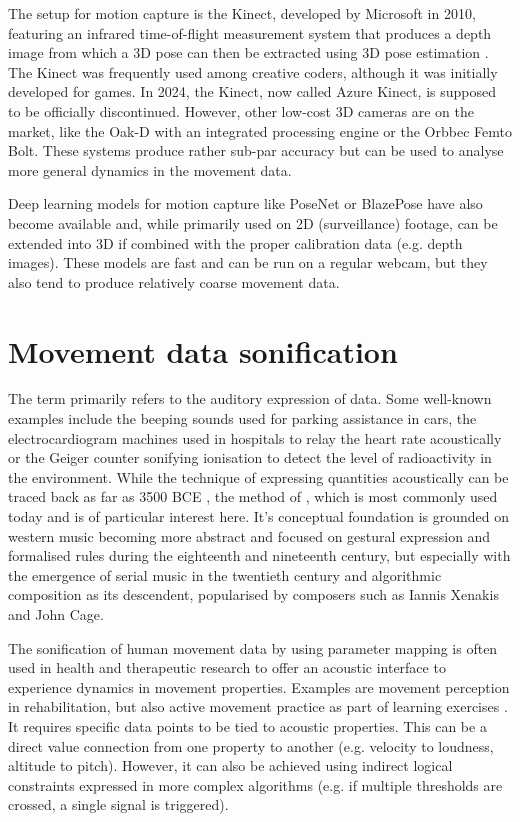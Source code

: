 The  setup for motion capture is the Kinect, developed by Microsoft in 2010, featuring an infrared time-of-flight measurement system that produces a depth image from which a 3D pose can then be extracted using \ac{3D} pose estimation \parencite[see][]{poseEstimationPaper}. The Kinect was frequently used among creative coders, although it was initially developed for games. In 2024, the Kinect, now called Azure Kinect, is supposed to be officially discontinued. However, other low-cost 3D cameras are on the market, like the Oak-D with an integrated processing engine or the Orbbec Femto Bolt. These systems produce rather sub-par accuracy but can be used to analyse more general dynamics in the movement data.

Deep learning models for motion capture like PoseNet or BlazePose have also become available and, while primarily used on 2D (surveillance) footage, can be extended into 3D if combined with the proper calibration data (e.g. depth images). These models are fast and can be run on a regular webcam, but they also tend to produce relatively coarse movement data.

\section{Movement data sonification}

The term  primarily refers to the auditory expression of data. Some well-known examples include the beeping sounds used for parking assistance in cars, the electrocardiogram machines used in hospitals to relay the heart rate acoustically or the Geiger counter sonifying ionisation to detect the level of radioactivity in the environment. While the technique of expressing quantities acoustically can be traced back as far as 3500 BCE \parencite[178]{sonificationPreHistory}, the method of  \parencite[Chapter~15]{sonificationHandbook}, which is most commonly used today and is of particular interest here. It's conceptual foundation is grounded on western music becoming more abstract and focused on gestural expression and formalised rules during the eighteenth and nineteenth century, but especially with the emergence of serial music in the twentieth century \parencite[179-180]{sonificationPreHistory} and algorithmic composition as its descendent, popularised by composers such as Iannis Xenakis and John Cage.

The sonification of human movement data by using parameter mapping is often used in health and therapeutic research to offer an acoustic interface to experience dynamics in movement properties. Examples are movement perception in rehabilitation, but also active movement practice as part of learning exercises \parencite[see][]{ifMotionSounds}. It requires specific data points to be tied to acoustic properties. This can be a direct value connection from one property to another (e.g. velocity to loudness, altitude to pitch). However, it can also be achieved using indirect logical constraints expressed in more complex algorithms (e.g. if multiple thresholds are crossed, a single signal is triggered).

